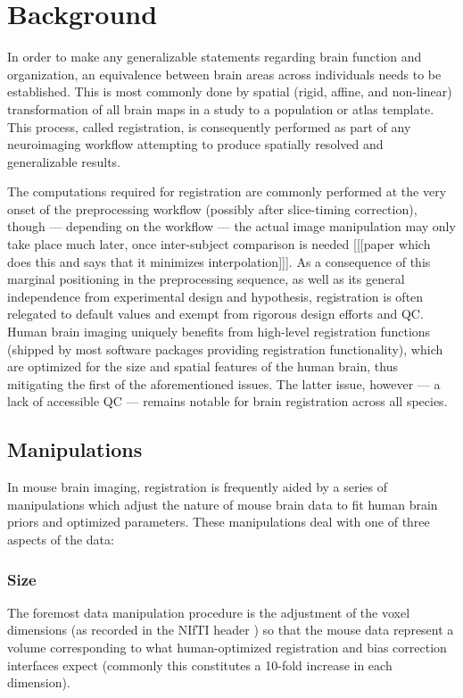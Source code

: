 \section{Background}

In order to make any generalizable statements regarding brain function and organization, an equivalence between brain areas across individuals needs to be established.
This is most commonly done by spatial (rigid, affine, and non-linear) transformation of all brain maps in a study to a population or atlas template.
This process, called registration, is consequently performed as part of any neuroimaging workflow attempting to produce spatially resolved and generalizable results.

The computations required for registration are commonly performed at the very onset of the preprocessing workflow (possibly after slice-timing correction),
though --- depending on the workflow --- the actual image manipulation may only take place much later, once inter-subject comparison is needed [[[paper which does this and says that it minimizes interpolation]]].
As a consequence of this marginal positioning in the preprocessing sequence, as well as its general independence from experimental design and hypothesis, registration is often relegated to default values and exempt from rigorous design efforts and QC.
Human brain imaging uniquely benefits from high-level registration functions (shipped by most software packages providing registration functionality), which are optimized for the size and spatial features of the human brain, thus mitigating the first of the aforementioned issues.
The latter issue, however --- a lack of accessible QC --- remains notable for brain registration across all species.

\subsection*{Manipulations}
In mouse brain imaging, registration is frequently aided by a series of manipulations which adjust the nature of mouse brain data to fit human brain priors and optimized parameters.
These manipulations deal with one of three aspects of the data:

\subsubsection*{Size}
The foremost data manipulation procedure is the adjustment of the voxel dimensions (as recorded in the NIfTI header \cite{nifti}) so that the mouse data represent a volume corresponding to what human-optimized registration and bias correction interfaces expect (commonly this constitutes a 10-fold increase in each dimension).	

